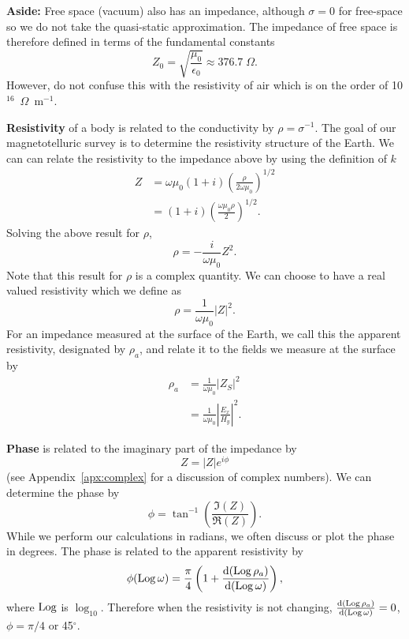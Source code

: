 \begin{framed}
    {\bf Aside:} Free space (vacuum) also has an impedance, although $\sigma =
    0$ for free-space so we do not take the quasi-static approximation.  The
    impedance of free space is therefore defined in terms of the fundamental
    constants
    \begin{equation*}
        Z_{0} = \sqrt{\frac{\mu_0}{\epsilon_0}} \approx 376.7\; \Omega. 
    \end{equation*}
    However, do not confuse this with the resistivity of air which is on the
    order of 10$^{16}$~$\Omega$~m$^{-1}$.
\end{framed}

{\bf Resistivity} of a body is related to the conductivity by $\rho =
\sigma^{-1}$.  The goal of our magnetotelluric survey is to determine the
resistivity structure of the Earth.  We can can relate the resistivity to the
impedance above by using the definition of $k$
\begin{align*}
    Z & = \omega \mu_0 (1 + i) \left(\frac{\rho}{ 2 \omega \mu_0} \right)^{1/2} \\
      & = (1 + i) \left( \frac{\omega \mu_0 \rho}{2} \right)^{1/2}.
\end{align*}
Solving the above result for $\rho$,
\begin{equation*}
    \rho = -\frac{i}{\omega \mu_0} Z^2.
\end{equation*}
Note that this result for $\rho$ is a complex quantity.  We can choose to have a
real valued resistivity which we define as
\begin{equation*}
    \rho = \frac{1}{\omega \mu_0} | Z |^2.
\end{equation*}
For an impedance measured at the surface of the Earth, we call this the apparent
resistivity, designated by $\rho_a$, and relate it to the fields we measure at
the surface by
\begin{align*}
    \rho_a & = \frac{1}{\omega \mu_0} | Z_S |^2 \\
           & = \frac{1}{\omega \mu_0} \left| \frac{E_x}{H_y} \right|^2.
\end{align*}

{\bf Phase} is related to the imaginary part of the impedance by
\begin{equation*}
    Z = |Z| e^{i \phi}
\end{equation*}
(see Appendix~\ref{apx:complex} for a discussion of complex numbers).  We can
determine the phase by
\begin{equation*}
    \phi = \tan^{-1} \left( \frac{\Im (Z)}{\Re (Z)} \right).
\end{equation*}
While we perform our calculations in radians, we often discuss or plot the phase
in degrees.  The phase is related to the apparent resistivity by
\begin{equation*}
    \phi(\operatorname{Log} \omega) = \frac{\pi}{4}
        \left( 1 + \dv{(\operatorname{Log}\rho_a)}{(\operatorname{Log}\omega)} \right),
\end{equation*}
where $\operatorname{Log}$ is $\log_{10}$.  Therefore when the resistivity is not changing,
$\dv{(\operatorname{Log}\rho_a)}{(\operatorname{Log}\omega)} = 0$, $\phi = \pi/4$ or 45$^\circ$.


